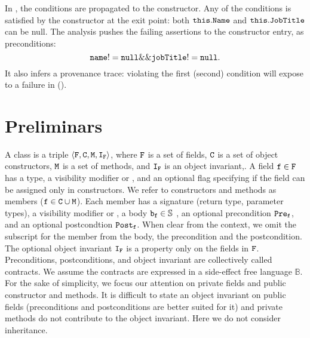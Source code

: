\documentclass{llncs}
\begin{document}
In , the conditions are propagated to the constructor.
Any of the conditions is satisfied by the constructor at the exit point: both $\mathtt{this.Name}$ and $\mathtt{this.JobTitle}$ can be null.
The analysis pushes the failing assertions to the constructor entry, as preconditions:
\[
\mathtt{name != null} \&\& \mathtt{jobTitle != null}.
\]
It also infers a provenance trace: violating the first (second) condition will expose to a failure in  (). 

\section{Preliminars}

A class is a triple $\langle  \mathtt{F}, \mathtt{C}, \mathtt{M}, \mathtt{I}_{\mathtt{F}}  \rangle$, where $\mathtt{F}$ is a set of fields,   $\mathtt{C}$ is a set of  object constructors,   $\mathtt{M}$ is a set of methods, and $\mathtt{I}_{\mathtt{F}}$ is an object invariant,.
A field $\mathtt{f} \in \mathtt{F}$ has a type, a visibility modifier  or , and an optional  flag specifying if the
 field can be assigned only in constructors.
We refer to constructors and methods as members ($\mathtt{f} \in \mathtt{C} \cup \mathtt{M}$).
Each member has a signature (return type, parameter types), a visibility modifier  or , a body $\mathtt{b}_{\mathtt{f}} \in \mathbb{S}$ , an optional precondition $\mathtt{Pre}_{\mathtt{f}}$, and an optional postcondtion $\mathtt{Post}_{\mathtt{f}}$.
When clear from the context, we omit the subscript for the member from the body, the precondition and the postcondition.
The optional object invariant $\mathtt{I}_{\mathtt{F}}$ is a property only on the fields in $\mathtt{F}$.
Preconditions, postconditions, and object invariant are collectively called contracts.
We assume the contracts  are expressed in a side-effect free language $\mathbb{B}$.
For the sake of simplicity, we focus our attention on private fields and public constructor and methods.
It is difficult to state an object invariant on public fields (preconditions and postconditions are better suited for it) and private methods do not contribute to the object invariant.  
Here we do not consider inheritance.
\end{document}

